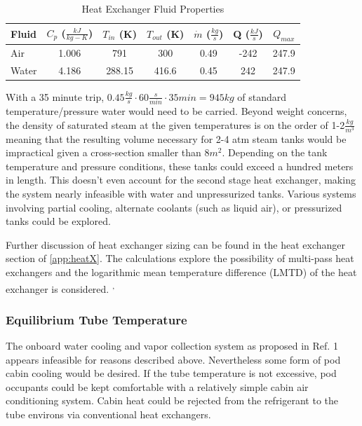 \documentclass[heading.tex]{subfiles}
\begin{document}

\begin{table}
    \centering
    \caption{Heat Exchanger Fluid Properties}
    \label{tab:HeatEx}
    \begin{tabular}{l  c  c  c  c  c  c} 
        \hline
        Fluid & $C_{p}$ ($\frac{kJ}{kg-K}$)& $T_{in}$ (K) & $T_{out}$ (K) & $\dot{m}$ ($\frac{kg}{s}$) & Q ($\frac{kJ}{s}$) & $Q_{max}$\\ \hline 
        Air & 1.006 & 791 & 300 & 0.49 & -242 & 247.9\\ 
        Water & 4.186 & 288.15 & 416.6 &0.45 & 242 & 247.9\\ \hline
    \end{tabular}
\end{table}

With a 35 minute trip, $0.45 \frac{kg}{s} \cdot 60 \frac{s}{min} \cdot 35min = 945 kg$
of standard temperature/pressure water would need to be carried.
Beyond weight concerns, the density of saturated steam at the given temperatures is on the order of 1-2$\frac{kg}{m^{3}}$
meaning that the resulting volume necessary for 2-4 atm
steam tanks would be impractical given a cross-section smaller than 8$m^{2}$.
Depending on the tank temperature and pressure conditions, these tanks could exceed a hundred meters in length.
This doesn't even account for the second stage heat exchanger,
making the system nearly infeasible with water and unpressurized tanks.
Various systems involving partial cooling, alternate coolants (such as liquid air), or pressurized tanks could be explored.

Further discussion of heat exchanger sizing can be found in the heat exchanger section of \cref{app:heatX}.
The calculations explore the possibility of multi-pass heat exchangers
and the logarithmic mean temperature difference (LMTD) of the heat exchanger is considered.
\cite{Cengal}\textsuperscript{,}
\cite{Turns}


\subsubsection{Equilibrium Tube Temperature}

The onboard water cooling and vapor collection system as proposed in Ref. 1
appears infeasible for reasons described above.
Nevertheless some form of pod cabin cooling would be desired. 
If the tube temperature is not excessive,
pod occupants could be kept comfortable with a relatively simple cabin air conditioning system.
Cabin heat could be rejected from the refrigerant to the tube environs via conventional heat
exchangers.
\end{document}
